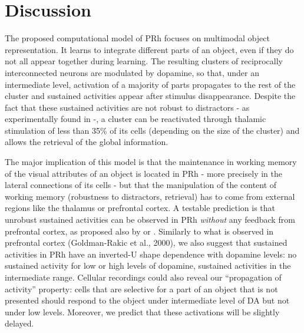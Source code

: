 \documentclass[
  11pt,
  a4paper,
]{scrbook}
\begin{document}
\section{Discussion}\label{discussion}

The proposed computational model of PRh focuses on multimodal object
representation. It learns to integrate different parts of an object,
even if they do not all appear together during learning. The resulting
clusters of reciprocally interconnected neurons are modulated by
dopamine, so that, under an intermediate level, activation of a majority
of parts propagates to the rest of the cluster and sustained activities
appear after stimulus disappearance. Despite the fact that these
sustained activities are not robust to distractors - as experimentally
found in -, a cluster can be reactivated through thalamic stimulation of
less than 35\% of its cells (depending on the size of the cluster) and
allows the retrieval of the global information.

The major implication of this model is that the maintenance in working
memory of the visual attributes of an object is located in PRh - more
precisely in the lateral connections of its cells - but that the
manipulation of the content of working memory (robustness to
distractors, retrieval) has to come from external regions like the
thalamus or prefrontal cortex. A testable prediction is that unrobust
sustained activities can be observed in PRh \emph{without} any feedback
from prefrontal cortex, as proposed also by or . Similarly to what is
observed in prefrontal cortex (Goldman-Rakic et al., 2000), we also
suggest that sustained activities in PRh have an inverted-U shape
dependence with dopamine levels: no sustained activity for low or high
levels of dopamine, sustained activities in the intermediate range.
Cellular recordings could also reveal our ``propagation of activity''
property: cells that are selective for a part of an object that is not
presented should respond to the object under intermediate level of DA
but not under low levels. Moreover, we predict that these activations
will be slightly delayed.
\end{document}
